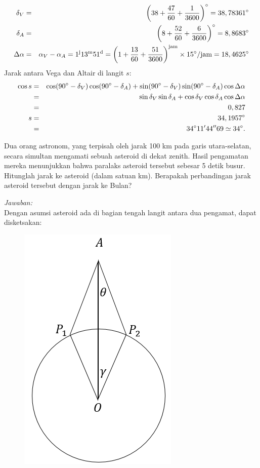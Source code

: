 \documentclass[11pt,fleqn]{exam}
\begin{document}
\begin{questions}
\begin{eqnarray*}
\delta_V&=& \left(38+\frac{47}{60}+\frac{1}{3600}\right)\degree =38,78361\degree \\
\delta_A&=& \left(8+\frac{52}{60}+\frac{6}{3600}\right)\degree =8,8683\degree \\
\Delta\alpha&=&\alpha_V-\alpha_A=1^\text{j}13^\text{m}51^\text{d}=\left(1+\frac{13}{60}+\frac{51}{3600}\right)^{\text{jam}}\times 15\degree{/\text{jam}}=18,4625\degree
\end{eqnarray*}
Jarak antara Vega dan Altair di langit $s$:
\begin{eqnarray*}
\cos s&=&\cos(90\degree-\delta_V)\cos(90\degree-\delta_A)+\sin(90\degree-\delta_V)\sin(90\degree-\delta_A)\cos \Delta\alpha\\
&=&\sin \delta_V\sin \delta_A+\cos \delta_V\cos \delta_A\cos \Delta\alpha\\
&=&0,827\\
s&=&34,1957\degree\\
&=&34\degree11'44''69 \simeq 34\degree.
\end{eqnarray*}


\question Dua orang astronom, yang terpisah oleh jarak 100 km pada garis utara\--selatan, secara simultan mengamati sebuah asteroid di dekat zenith. Hasil pengamatan mereka menunjukkan bahwa paralaks asteroid tersebut sebesar 5 detik busur. Hitunglah jarak ke asteroid (dalam satuan km). Berapakah perbandingan jarak asteroid tersebut dengan jarak ke Bulan?

\textit{Jawaban: }\\
Dengan asumsi asteroid ada di bagian tengah langit antara dua pengamat, dapat disketsakan:
\begin{figure}[h!]
\centering
\includegraphics[scale=0.8]{asteroid.PNG}
\end{figure}


\end{questions}
\end{document}
